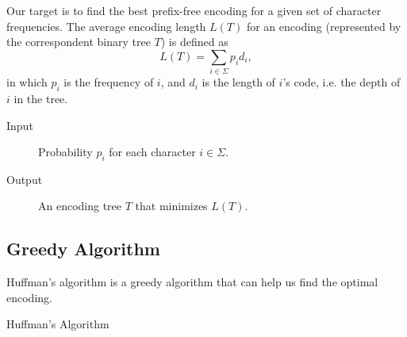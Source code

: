Our target is to find the best prefix-free encoding for a given set of character frequencies. The average encoding length $L(T)$ for an encoding (represented by the correspondent binary tree $T$) is defined as
$$L(T)=\sum\limits_{i\in\Sigma}p_id_i,$$
in which $p_i$ is the frequency of $i$, and $d_i$ is the length of $i$'s code, i.e. the depth of $i$ in the tree.
\begin{description}
\item[Input]Probability $p_i$ for each character $i\in\Sigma$.
\item[Output]An encoding tree $T$ that minimizes $L(T).$
\end{description}

\subsection{Greedy Algorithm}
Huffman's algorithm is a greedy algorithm that can help us find the optimal encoding.
\begin{algorithm}[ht]
\caption{Huffman's Algorithm}\label{huffman}
\begin{algorithmic}[1]
\EndIf
{}
\end{algorithmic}
\end{algorithm}

